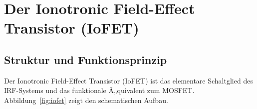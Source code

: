 ﻿\documentclass[a4paper,12pt]{scrreprt}
\theoremstyle{definition}
\begin{document}
\section{Der Ionotronic Field-Effect Transistor (IoFET)}

\subsection{Struktur und Funktionsprinzip}

Der Ionotronic Field-Effect Transistor (IoFET) ist das elementare Schaltglied
des IRF-Systems und das funktionale Ã„quivalent zum MOSFET. Abbildung~\ref{fig:iofet}
zeigt den schematischen Aufbau.
\end{document}
